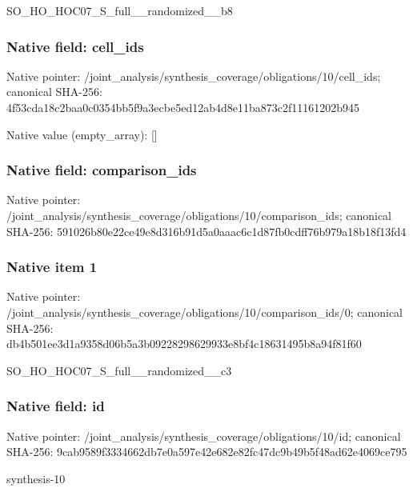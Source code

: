 \documentclass[10pt,a4paper]{article}
\begin{document}
\begingroup\raggedright\sloppy SO\_\allowbreak{}HO\_\allowbreak{}HOC07\_\allowbreak{}S\_\allowbreak{}full\_\allowbreak{}\_\allowbreak{}randomized\_\allowbreak{}\_\allowbreak{}b8\par\endgroup

\subsubsection{Native field: cell\_\allowbreak{}ids}
Native pointer: /joint\_\allowbreak{}analysis/synthesis\_\allowbreak{}coverage/obligations/10/cell\_\allowbreak{}ids; canonical SHA-256: 4f53cda18c2baa0c0354bb5f9a3ecbe5ed12ab4d8e11ba873c2f11161202b945

Native value (empty\_\allowbreak{}array): []

\subsubsection{Native field: comparison\_\allowbreak{}ids}
Native pointer: /joint\_\allowbreak{}analysis/synthesis\_\allowbreak{}coverage/obligations/10/comparison\_\allowbreak{}ids; canonical SHA-256: 591026b80e22ce49e8d316b91d5a0aaac6c1d87fb0cdff76b979a18b18f13fd4

\subsubsection{Native item 1}
Native pointer: /joint\_\allowbreak{}analysis/synthesis\_\allowbreak{}coverage/obligations/10/comparison\_\allowbreak{}ids/0; canonical SHA-256: db4b501ee3d1a9358d06b5a3b09228298629933e8bf4c18631495b8a94f81f60

\begingroup\raggedright\sloppy SO\_\allowbreak{}HO\_\allowbreak{}HOC07\_\allowbreak{}S\_\allowbreak{}full\_\allowbreak{}\_\allowbreak{}randomized\_\allowbreak{}\_\allowbreak{}c3\par\endgroup

\subsubsection{Native field: id}
Native pointer: /joint\_\allowbreak{}analysis/synthesis\_\allowbreak{}coverage/obligations/10/id; canonical SHA-256: 9cab9589f3334662db7e0a597e42e682e82fc47dc9b49b5f48ad62e4069ce795

\begingroup\raggedright\sloppy synthesis-10\par\endgroup
\end{document}
